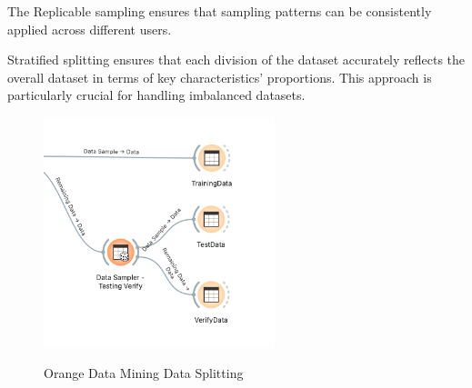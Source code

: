The Replicable sampling ensures that sampling patterns can be consistently applied
across different users.

Stratified splitting ensures that each division of the dataset accurately 
reflects the overall dataset in terms of key characteristics' proportions. 
This approach is particularly crucial for handling imbalanced datasets.

\begin{figure}[H]%
    \caption{Orange Data Mining Data Splitting}%
    \label{fig:data_preparation_splitting}%
    \centering
    {\includegraphics[width=0.6\textwidth]{img/datapreparation/datapreparation_splitting.png} }
\end{figure}

